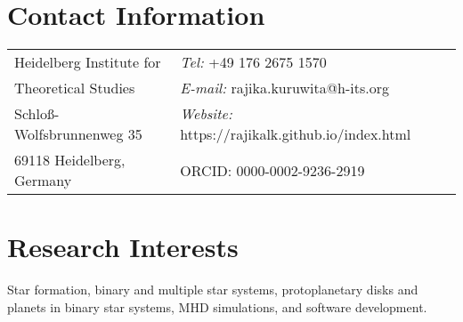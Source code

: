 \documentclass[margin,line]{res}
\begin{document}
	
	\begin{resume}
 \vspace*{-0.1cm}
		\section{\sc Contact Information}
		\begin{tabular}{@{}p{2.4in}p{3in}}
			Heidelberg Institute for  & {\it Tel:}    +49 176 2675 1570 \\         
			Theoretical Studies & {\it E-mail:}  rajika.kuruwita@h-its.org\\ 
			Schloß-Wolfsbrunnenweg 35 &{\it Website:}  https://rajikalk.github.io/index.html\\   
			69118 Heidelberg, Germany  & ORCID: 0000-0002-9236-2919 \\     
		\end{tabular}

\vspace*{-0.1cm}

		\section{\sc Research Interests}
		Star formation, binary and multiple star systems, protoplanetary disks and planets in binary star systems, MHD simulations, and software development.

\vspace*{-0.1cm}
  

\end{resume}
\end{document}
